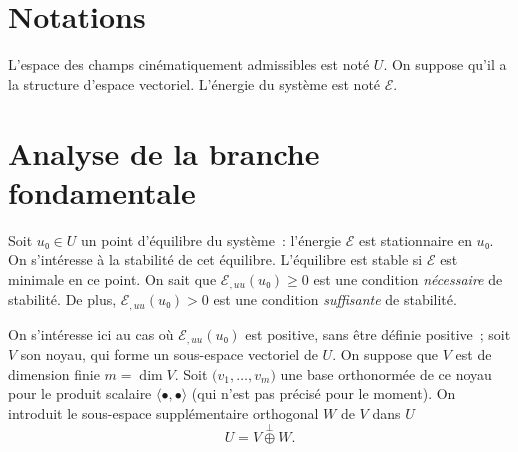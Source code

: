 \documentclass[12pt, final]{amsart}
\begin{document}
\title{\mytitle}
\author{\myauthor}
\address{\myaddress}

\begin{abstract}
  blabla
\end{abstract}


\maketitle


\section{Notations}

L'espace des champs cinématiquement admissibles est noté \(U\). On suppose
qu'il a la structure d'espace vectoriel. L'énergie du système est noté
\(\mathcal E\).

\section{Analyse de la branche fondamentale}

Soit \(u₀\in U\) un point d'équilibre du système~: l'énergie \(\mathcal E\)
est stationnaire en \(u₀\). On s'intéresse à la stabilité de cet
équilibre. L'équilibre est stable si \(\mathcal E\) est minimale en ce
point. On sait que \(\mathcal E_{,uu}(u₀)\geq0\) est une condition
\emph{nécessaire} de stabilité. De plus, \(\mathcal E_{,uu}(u₀)>0\) est une
condition \emph{suffisante} de stabilité.

On s'intéresse ici au cas où \(\mathcal E_{,uu}(u₀)\) est positive, sans être
définie positive~; soit \(V\) son noyau, qui forme un sous-espace vectoriel de
\(U\). On suppose que \(V\) est de dimension finie \(m=\dim V\). Soit
\(\bigl(v_1, \ldots, v_m\bigr)\) une base orthonormée de ce noyau pour le
produit scalaire \(\langle\bullet,\bullet\rangle\) (qui n'est pas précisé pour
le moment). On introduit le sous-espace supplémentaire orthogonal \(W\) de
\(V\) dans \(U\)
\begin{equation}
  U=V\stackrel{\perp}{\oplus} W.
\end{equation}
\end{document}

